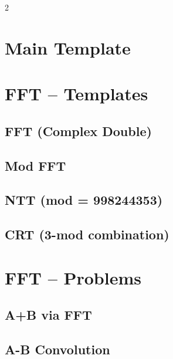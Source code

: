 \documentclass[10pt,a4paper]{extarticle}
\begin{document}
\begin{landscape}
\begin{multicols}{2}
\section{Main Template}


\section{FFT -- Templates}

\subsection{FFT (Complex Double)}


\subsection{Mod FFT}


\subsection{NTT (mod = 998244353)}


\subsection{CRT (3-mod combination)}


\section{FFT -- Problems}

\subsection{A+B via FFT}


\subsection{A-B Convolution}



\end{multicols}
\end{landscape}
\end{document}
